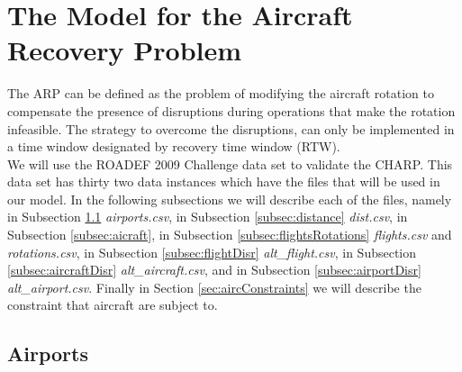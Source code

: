 \documentclass[ijoo,nonblindrev]{informs-ijoo}
\begin{document}
\section{The Model for the Aircraft Recovery Problem}\label{sec:modelARP}
The ARP can be defined as the problem of modifying the aircraft rotation to compensate the presence of disruptions during operations that make the rotation infeasible. The strategy to overcome the disruptions, can only be implemented in a time window designated by recovery time window (RTW).\\
	 We will use the ROADEF 2009 Challenge data set to validate the CHARP. This data set has thirty two data instances which have the files that will be used in our model. In the following subsections we will describe each of the files, namely in Subsection  \ref{subsec:airports} \textit{airports.csv}, in Subsection \ref{subsec:distance} \textit{dist.csv}, in Subsection \ref{subsec:aicraft}, in Subsection \ref{subsec:flightsRotations} \textit{flights.csv} and \textit{rotations.csv}, in Subsection \ref{subsec:flightDisr} \textit{alt\_flight.csv}, in Subsection \ref{subsec:aircraftDisr} \textit{alt\_aircraft.csv}, and in Subsection \ref{subsec:airportDisr} \textit{alt\_airport.csv}. Finally in Section \ref{sec:aircConstraints} we will describe the constraint that aircraft are subject to.
	 




\subsection{Airports} \label{subsec:airports}
\end{document}
